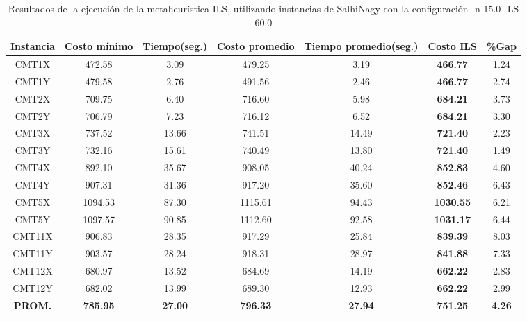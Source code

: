 \begin{table}[ht]
\caption{Resultados de la ejecución de la metaheurística ILS, utilizando instancias de SalhiNagy con la configuración -n 15.0 -LS 60.0}
\centering
\small
\begin{tabular}{c c c c c c c}
\hline\hline
Instancia & Costo mínimo & Tiempo(seg.) & Costo promedio & Tiempo promedio(seg.) & Costo ILS & \%Gap \\ [0.5ex]
\hline
CMT1X & 472.58 & 3.09 & 
479.25 & 3.19 & \bf{466.77} & 
1.24\\CMT1Y & 479.58 & 2.76 & 
491.56 & 2.46 & \bf{466.77} & 
2.74\\CMT2X & 709.75 & 6.40 & 
716.60 & 5.98 & \bf{684.21} & 
3.73\\CMT2Y & 706.79 & 7.23 & 
716.12 & 6.52 & \bf{684.21} & 
3.30\\CMT3X & 737.52 & 13.66 & 
741.51 & 14.49 & \bf{721.40} & 
2.23\\CMT3Y & 732.16 & 15.61 & 
740.49 & 13.80 & \bf{721.40} & 
1.49\\CMT4X & 892.10 & 35.67 & 
908.05 & 40.24 & \bf{852.83} & 
4.60\\CMT4Y & 907.31 & 31.36 & 
917.20 & 35.60 & \bf{852.46} & 
6.43\\CMT5X & 1094.53 & 87.30 & 
1115.61 & 94.43 & \bf{1030.55} & 
6.21\\CMT5Y & 1097.57 & 90.85 & 
1112.60 & 92.58 & \bf{1031.17} & 
6.44\\CMT11X & 906.83 & 28.35 & 
917.29 & 25.84 & \bf{839.39} & 
8.03\\CMT11Y & 903.57 & 28.24 & 
918.31 & 28.97 & \bf{841.88} & 
7.33\\CMT12X & 680.97 & 13.52 & 
684.69 & 14.19 & \bf{662.22} & 
2.83\\CMT12Y & 682.02 & 13.99 & 
689.30 & 12.93 & \bf{662.22} & 
2.99\\\bf{PROM.} & 
\bf{785.95} & \bf{27.00} & \bf{796.33} & \bf{27.94} & \bf{751.25} & \bf{4.26}\\[1ex]\hline
\end{tabular}
\label{table:nonlin}
\end{table} \clearpage
